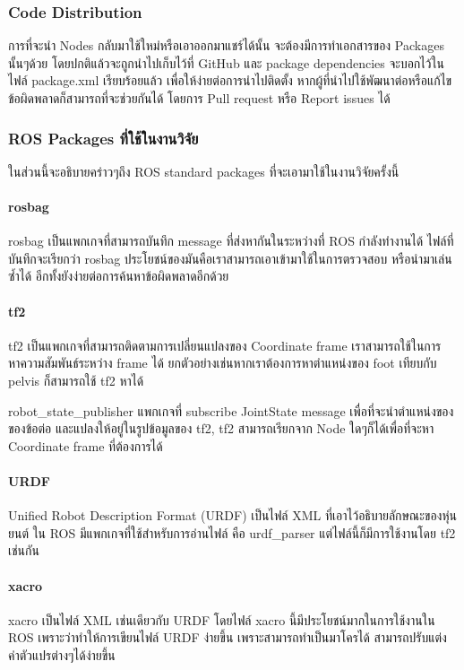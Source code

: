 \subsubsection*{Code Distribution}
การที่จะนำ Nodes กลับมาใช้ใหม่หรือเอาออกมาแชร์ได้นั้น จะต้องมีการทำเอกสารของ Packages นั้นๆด้วย
โดยปกติแล้วจะถูกนำไปเก็บไว้ที่ GitHub และ package dependencies จะบอกไว้ในไฟล์ package.xml
เรียบร้อยแล้ว เพื่อให้ง่ายต่อการนำไปติดตั้ง หากผู้ที่นำไปใช้พัฒนาต่อหรือแก้ไขข้อผิดพลาดก็สามารถที่จะช่วยกันได้
โดยการ Pull request หรือ Report issues ได้

\subsubsection*{ROS Packages ที่ใช้ในงานวิจัย}
ในส่วนนี้จะอธิบายคร่าวๆถึง ROS standard packages ที่จะเอามาใช้ในงานวิจัยครั้งนี้
\paragraph*{rosbag}
rosbag เป็นแพกเกจที่สามารถบันทึก message ที่ส่งหากันในระหว่างที่ ROS กำลังทำงานได้
ไฟล์ที่บันทึกจะเรียกว่า rosbag ประโยชน์ของมันคือเราสามารถเอาเข้ามาใช้ในการตรวจสอบ
หรือนำมาเล่นซ้ำได้ อีกทั้งยังง่ายต่อการค้นหาข้อผิดพลาดอีกด้วย

\paragraph*{tf2}
tf2 เป็นแพกเกจที่สามารถติดตามการเปลี่ยนแปลงของ Coordinate frame เราสามารถใช้ในการหาความสัมพันธ์ระหว่าง
frame ได้ ยกตัวอย่างเช่นหากเราต้องการหาตำแหน่งของ foot เทียบกับ pelvis ก็สามารถใช้ tf2 หาได้

robot\_state\_publisher แพกเกจที่ subscribe JointState message เพื่อที่จะนำตำแหน่งของของข้อต่อ
และแปลงให้อยู่ในรูปข้อมูลของ tf2, tf2 สามารถเรียกจาก Node ใดๆก็ได้เพื่อที่จะหา Coordinate frame ที่ต้องการได้

\paragraph*{URDF}
Unified Robot Description Format (URDF) เป็นไฟล์ XML ที่เอาไว้อธิบายลักษณะของหุ่นยนต์
ใน ROS มีแพกเกจที่ใช้สำหรับการอ่านไฟล์ คือ urdf\_parser แต่ไฟล์นี้ก็มีการใช้งานโดย tf2 เช่นกัน

\paragraph*{xacro}
xacro เป็นไฟล์ XML เช่นเดียวกับ URDF โดยไฟล์ xacro นี้มีประโยชน์มากในการใช้งานใน ROS เพราะว่าทำให้การเขียนไฟล์
URDF ง่ายขึ้น เพราะสามารถทำเป็นมาโครได้ สามารถปรับแต่งค่าตัวแปรต่างๆได้ง่ายขึ้น

